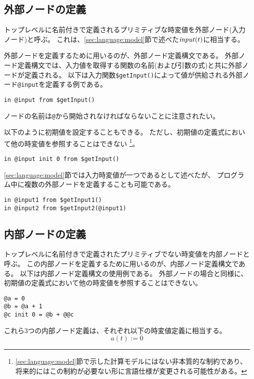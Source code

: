 \subsection{外部ノードの定義}
トップレベルに名前付きで定義されるプリミティブな時変値を外部ノード(入力ノード)と呼ぶ。
これは、\ref{sec:language:model}節で述べた${\it input}(t)$に相当する。

外部ノードを定義するために用いるのが、外部ノード定義構文である。
外部ノード定義構文では、入力値を取得する関数の名前(および引数の式)と共に外部ノードが定義される。
以下は入力関数\texttt{\$getInput()}によって値が供給される外部ノード\texttt{@input}を定義する例である。
\begin{lstlisting}[basicstyle=\ttfamily\small,language=SFRP]
in @input from $getInput()
\end{lstlisting}
ノードの名前は\texttt{@}から開始されなければならないことに注意されたい。

以下のように初期値を設定することもできる。
ただし、初期値の定義式において他の時変値を参照することはできない
\footnote[1]{
\ref{sec:language:model}節で示した計算モデルにはない非本質的な制約であり、
将来的にはこの制約が必要ない形に言語仕様が変更される可能性がある。
}。
\begin{lstlisting}[basicstyle=\ttfamily\small,language=SFRP]
in @input init 0 from $getInput()
\end{lstlisting}

\ref{sec:language:model}節では入力時変値が一つであるとして述べたが、
プログラム中に複数の外部ノードを定義することも可能である。
\begin{lstlisting}[basicstyle=\ttfamily\small,language=SFRP]
in @input1 from $getInput1()
in @input2 from $getInput2(@input1)
\end{lstlisting}

\subsection{内部ノードの定義}
トップレベルに名前付きで定義されたプリミティブでない時変値を内部ノードと呼ぶ。
この内部ノードを定義するために用いるのが、内部ノード定義構文である。
以下は内部ノード定義構文の使用例である。
外部ノードの場合と同様に、初期値の定義式において他の時変値を参照することはできない。
\begin{lstlisting}[basicstyle=\ttfamily\small,language=SFRP]
@a = 0
@b = @a + 1
@c init 0 = @b + @@c
\end{lstlisting}

これら3つの内部ノード定義は、それぞれ以下の時変値定義に相当する。
\begin{equation*}
  a(t) := 0
\end{equation*}

